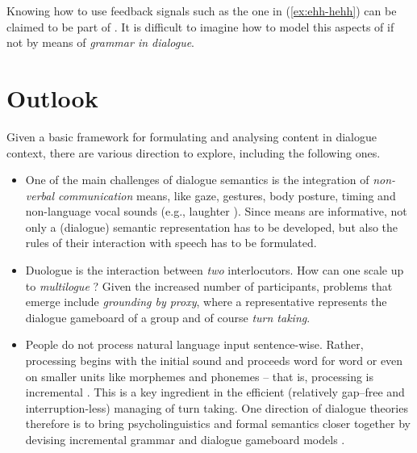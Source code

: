 \documentclass[output=paper]{langsci/langscibook}
\begin{document}
Knowing how  to use feedback signals   such as the one in (\ref{ex:ehh-hehh}) can be claimed to be part of .
%
It is difficult to imagine how to model this aspects of  if not by means of \emph{grammar in dialogue}.
 





\section{Outlook}
\label{sec:outlook}

Given a basic framework for formulating and analysing content in dialogue context, there are various direction to explore, including the following ones.

\begin{itemize}
    \item 
One of the main challenges of dialogue semantics is the integration of \emph{non-verbal communication} means, like gaze, gestures, body posture, timing and non-language  vocal sounds (e.g., laughter \citep{Ginzburg:Breitholz:Cooper:Hough:Tian:2015,Tian:Mazzocconi:Ginzburg:2016}).
%
Since  means are informative, not only a (dialogue) semantic representation has to be developed, but also the rules of their interaction with speech has to be formulated. 

\item Duologue  is the interaction between \emph{two} interlocutors. 
%
How can one scale up to \emph{multilogue}  \citep{Ginzburg:Fernandez:2005}?
%
Given the increased number of participants,  problems that emerge include  \emph{grounding by proxy},  where a representative represents the dialogue gameboard of a group and of course \emph{turn taking}.

\item People do not process natural language input sentence-wise.
%
Rather, processing begins with the initial sound and proceeds word for word or even on smaller units like morphemes and phonemes -- that is, processing is incremental   \citep{Sedivy:Tanenhaus:Chambers:Carlson:1999}. This is a key ingredient in the efficient (relatively gap--free and interruption-less) managing of turn taking.
%
One direction of dialogue theories therefore is to bring psycholinguistics and formal semantics closer together by devising incremental grammar and dialogue gameboard models \citep{Hough:Kennington:Schlangen:Ginzburg:2015,Demberg:Keller:Koller:2013,Poesio:Rieser:2011}.

\end{itemize}
\end{document}
